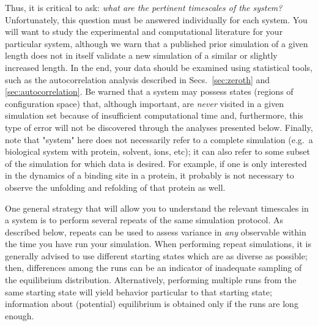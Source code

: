 Thus, it is critical to ask: \emph{what are the pertinent timescales of the system?} 
Unfortunately, this question must be answered individually for each system.  You will want to study the experimental and computational literature for your particular system, although we warn that a published prior simulation of a given length does not in itself validate a new simulation of a similar or slightly increased length.  In the end, your data should be examined using statistical tools, such as the autocorrelation analysis described in Secs.~\ref{sec:zeroth} and \ref{sec:autocorrelation}.  Be warned that a system may possess states (regions of configuration space) that, although important, are \emph{never} visited in a given simulation set because of insufficient computational time \cite{Grossfield2009} and, furthermore, this type of error will not be discovered through the analyses presented below.
Finally, note that "system" here does not necessarily refer to a complete simulation (e.g.~a biological system with protein, solvent, ions, etc); it can also refer to some subset of the simulation for which data is desired.  For example, if one is only interested in the dynamics of a binding site in a protein, it probably is not necessary to observe the unfolding and refolding of that protein as well.

One general strategy that will allow you to understand the relevant timescales in a system is to perform several repeats of the same simulation protocol.  As described below, repeats can be used to assess variance in \emph{any} observable within the time you have run your simulation.
When performing repeat simulations, it is generally advised to use different starting states which are as diverse as possible; then, differences among the runs can be an indicator of inadequate sampling of the equilibrium distribution.
Alternatively, performing multiple runs from the same starting state will yield behavior particular to that starting state; information about (potential) equilibrium is obtained only if the runs are long enough.



